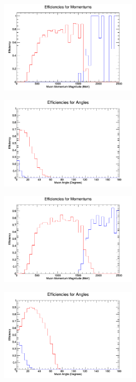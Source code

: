 \documentclass[11pt]{article}
\begin{document}
\begin{figure}[H]
\centering
\includegraphics[width=0.6\textwidth]{NMCombinedPlotsImages/2-NMCombinedPlots.png}
\caption{}
\end{figure}

\begin{figure}[H]
\centering
\includegraphics[width=0.6\textwidth]{NMCombinedPlotsImages/3-NMCombinedPlots.png}
\caption{}
\end{figure}

\begin{figure}[H]
\centering
\includegraphics[width=0.6\textwidth]{NMCombinedPlotsImages/4-NMCombinedPlots.png}
\caption{}
\end{figure}

\begin{figure}[H]
\centering
\includegraphics[width=0.6\textwidth]{NMCombinedPlotsImages/5-NMCombinedPlots.png}
\caption{}
\end{figure}
\end{document}
